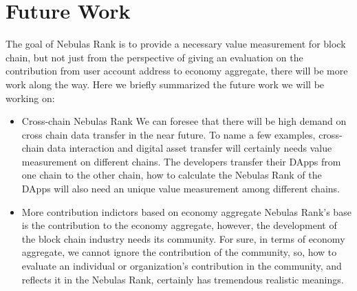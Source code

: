 \section{Future Work}
The goal of Nebulas Rank is to provide a necessary value measurement for block chain, but not just from the perspective of giving an evaluation on the contribution from user account address to economy aggregate, there will be more work along the way. Here we briefly summarized the future work we will be working on:
\begin{itemize}
\item{Cross-chain Nebulas Rank} We can foresee that there will be high demand on cross chain data transfer in the near future. To name a few examples, cross-chain data interaction and digital asset transfer will certainly needs value measurement on different chains. The developers transfer their DApps from one chain to the other chain, how to calculate the Nebulas Rank of the DApps will also need an unique value measurement among different chains.
\item{More contribution indictors based on economy aggregate} Nebulas Rank’s base is the contribution to the economy aggregate, however, the development of the block chain industry needs its community. For sure, in terms of economy aggregate, we cannot ignore the contribution of the community, so, how to evaluate an individual or organization’s contribution in the community, and reflects it in the Nebulas Rank, certainly has tremendous realistic meanings.

\end{itemize}
